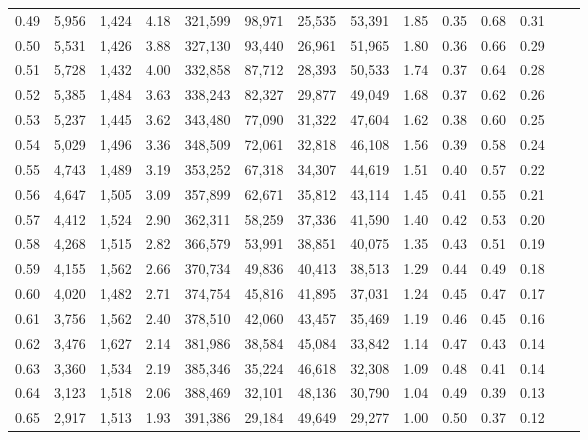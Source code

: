 \begin{tabular}{rrrrrrrrrrrrrr}
0.49 &  5,956 &  1,424 &    4.18 &  321,599 &   98,971 &  25,535 &  53,391 &  1.85 &  0.35 &  0.68 &      0.31 \\
0.50 &  5,531 &  1,426 &    3.88 &  327,130 &   93,440 &  26,961 &  51,965 &  1.80 &  0.36 &  0.66 &      0.29 \\
0.51 &  5,728 &  1,432 &    4.00 &  332,858 &   87,712 &  28,393 &  50,533 &  1.74 &  0.37 &  0.64 &      0.28 \\
0.52 &  5,385 &  1,484 &    3.63 &  338,243 &   82,327 &  29,877 &  49,049 &  1.68 &  0.37 &  0.62 &      0.26 \\
0.53 &  5,237 &  1,445 &    3.62 &  343,480 &   77,090 &  31,322 &  47,604 &  1.62 &  0.38 &  0.60 &      0.25 \\
0.54 &  5,029 &  1,496 &    3.36 &  348,509 &   72,061 &  32,818 &  46,108 &  1.56 &  0.39 &  0.58 &      0.24 \\
0.55 &  4,743 &  1,489 &    3.19 &  353,252 &   67,318 &  34,307 &  44,619 &  1.51 &  0.40 &  0.57 &      0.22 \\
0.56 &  4,647 &  1,505 &    3.09 &  357,899 &   62,671 &  35,812 &  43,114 &  1.45 &  0.41 &  0.55 &      0.21 \\
0.57 &  4,412 &  1,524 &    2.90 &  362,311 &   58,259 &  37,336 &  41,590 &  1.40 &  0.42 &  0.53 &      0.20 \\
0.58 &  4,268 &  1,515 &    2.82 &  366,579 &   53,991 &  38,851 &  40,075 &  1.35 &  0.43 &  0.51 &      0.19 \\
0.59 &  4,155 &  1,562 &    2.66 &  370,734 &   49,836 &  40,413 &  38,513 &  1.29 &  0.44 &  0.49 &      0.18 \\
0.60 &  4,020 &  1,482 &    2.71 &  374,754 &   45,816 &  41,895 &  37,031 &  1.24 &  0.45 &  0.47 &      0.17 \\
0.61 &  3,756 &  1,562 &    2.40 &  378,510 &   42,060 &  43,457 &  35,469 &  1.19 &  0.46 &  0.45 &      0.16 \\
0.62 &  3,476 &  1,627 &    2.14 &  381,986 &   38,584 &  45,084 &  33,842 &  1.14 &  0.47 &  0.43 &      0.14 \\
0.63 &  3,360 &  1,534 &    2.19 &  385,346 &   35,224 &  46,618 &  32,308 &  1.09 &  0.48 &  0.41 &      0.14 \\
0.64 &  3,123 &  1,518 &    2.06 &  388,469 &   32,101 &  48,136 &  30,790 &  1.04 &  0.49 &  0.39 &      0.13 \\
0.65 &  2,917 &  1,513 &    1.93 &  391,386 &   29,184 &  49,649 &  29,277 &  1.00 &  0.50 &  0.37 &      0.12 \\

\end{tabular}
